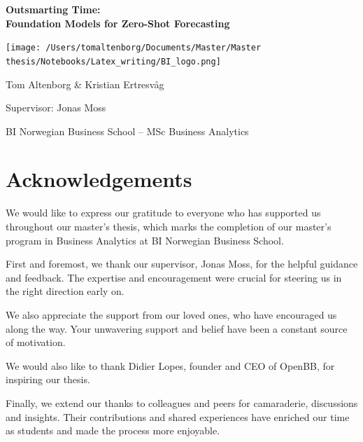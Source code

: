 \documentclass[12pt,a4paper]{article}
\begin{document}
\begin{titlepage}
  \centering
  \vspace*{1cm} %
 {\LARGE \bfseries Outsmarting Time: \\[0.5em] %
 \huge{Foundation Models for Zero-Shot Forecasting}\par} %

  \texttt{[image: /Users/tomaltenborg/Documents/Master/Master thesis/Notebooks/Latex\_writing/BI\_logo.png]} %

  \vspace{1.5cm}
  {\large Tom Altenborg \& Kristian Ertresvåg\par} %
  \vspace{0.5cm}
  {\large Supervisor: Jonas Moss\par} %
  \vspace{1cm}
  {\large BI Norwegian Business School – MSc Business Analytics\par} %
  \vspace{2cm} 
\end{titlepage}
\section*{Acknowledgements}
We would like to express our gratitude to everyone who has supported us throughout our master’s thesis, which marks the completion of our master’s program in Business Analytics at BI Norwegian Business School.

First and foremost, we thank our supervisor, Jonas Moss, for the helpful guidance and feedback. The expertise and encouragement were crucial for steering us in the right direction early on. 

We also appreciate the support from our loved ones, who have encouraged us along the way. Your unwavering support and belief have been a constant source of motivation.

We would also like to thank Didier Lopes, founder and CEO of OpenBB, for inspiring our thesis.  

Finally, we extend our thanks to colleagues and peers for camaraderie, discussions and insights. Their contributions and shared experiences have enriched our time as students and made the process more enjoyable.
\end{document}
